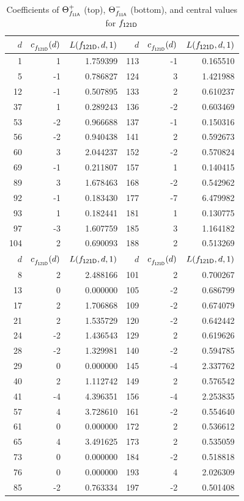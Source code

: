 \begin{table}
\begin{tabular}{||r|rr||r|rr||}
\hline
$d$ & $c^{}_{f_\mathsf{{121D}}}(d)$ & $L(f_\mathsf{{121D}},d,1)$& $d$ & $c^{}_{f_\mathsf{{121D}}}(d)$ & $L(f_\mathsf{{121D}},d,1)$\\
\hline
   1 & 1 & 1.759399 & 113 & -1 & 0.165510 \\
   5 & -1 & 0.786827 & 124 & 3 & 1.421988 \\
   12 & -1 & 0.507895 & 133 & 2 & 0.610237 \\
   37 & 1 & 0.289243 & 136 & -2 & 0.603469 \\
   53 & -2 & 0.966688 & 137 & -1 & 0.150316 \\
   56 & -2 & 0.940438 & 141 & 2 & 0.592673 \\
   60 & 3 & 2.044237 & 152 & -2 & 0.570824 \\
   69 & -1 & 0.211807 & 157 & 1 & 0.140415 \\
   89 & 3 & 1.678463 & 168 & -2 & 0.542962 \\
   92 & -1 & 0.183430 & 177 & -7 & 6.479982 \\
   93 & 1 & 0.182441 & 181 & 1 & 0.130775 \\
   97 & -3 & 1.607759 & 185 & 3 & 1.164182 \\
   104 & 2 & 0.690093 & 188 & 2 & 0.513269 \\
\hline
$d$ & $c^{}_{f_\mathsf{{121D}}}(d)$ & $L(f_\mathsf{{121D}},d,1)$& $d$ & $c^{}_{f_\mathsf{{121D}}}(d)$ & $L(f_\mathsf{{121D}},d,1)$\\
\hline
   8 & 2 & 2.488166 & 101 & 2 & 0.700267 \\
   13 & 0 & 0.000000 & 105 & -2 & 0.686799 \\
   17 & 2 & 1.706868 & 109 & -2 & 0.674079 \\
   21 & 2 & 1.535729 & 120 & -2 & 0.642442 \\
   24 & -2 & 1.436543 & 129 & 2 & 0.619626 \\
   28 & -2 & 1.329981 & 140 & -2 & 0.594785 \\
   29 & 0 & 0.000000 & 145 & -4 & 2.337762 \\
   40 & 2 & 1.112742 & 149 & 2 & 0.576542 \\
   41 & -4 & 4.396351 & 156 & -4 & 2.253835 \\
   57 & 4 & 3.728610 & 161 & -2 & 0.554640 \\
   61 & 0 & 0.000000 & 172 & 2 & 0.536612 \\
   65 & 4 & 3.491625 & 173 & 2 & 0.535059 \\
   73 & 0 & 0.000000 & 184 & -2 & 0.518818 \\
   76 & 0 & 0.000000 & 193 & 4 & 2.026309 \\
   85 & -2 & 0.763334 & 197 & -2 & 0.501408 \\
\hline
\end{tabular}
\caption{Coefficients of
${\Theta}^+_{f_\mathsf{{11A}}}$ (top),
${\Theta}^-_{f_\mathsf{{11A}}}$ (bottom), and central values for $f_\mathsf{{121D}}$
          \label{table:dlcs:11A}}
\end{table}
